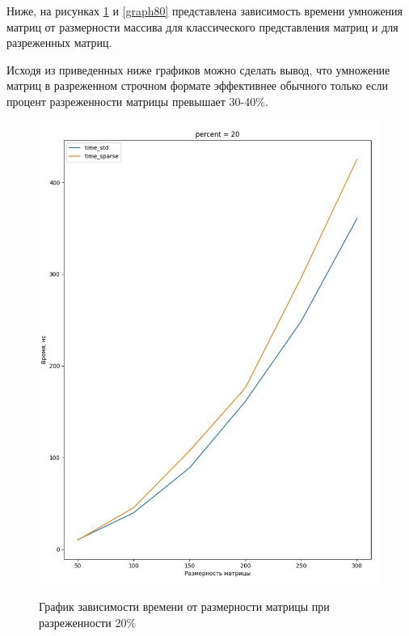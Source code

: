 Ниже, на рисунках \ref{graph20} и \ref{graph80} представлена зависимость времени умножения матриц от размерности массива для классического представления матриц и для разреженных матриц.

Исходя из приведенных ниже графиков можно сделать вывод, что умножение матриц в разреженном строчном формате эффективнее обычного только если процент разреженности матрицы превышает 30-40\%.

\pagebreak

\begin{figure}
	\centering
	\caption{График зависимости времени от размерности матрицы при разреженности 20\%}
	\includegraphics[width=\linewidth]{img/graph20.jpg}
	\label{graph20}
\end{figure}

\pagebreak

